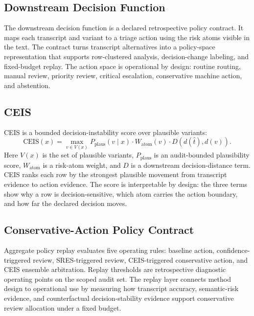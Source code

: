 \subsection{Downstream Decision Function}

The downstream decision function is a declared retrospective policy contract. It maps each transcript and variant to a triage action using the risk atoms visible in the text. The contract turns transcript alternatives into a policy-space representation that supports row-clustered analysis, decision-change labeling, and fixed-budget replay. The action space is operational by design: routine routing, manual review, priority review, critical escalation, conservative machine action, and abstention.

\subsection{CEIS}

CEIS is a bounded decision-instability score over plausible variants:
\[
\mathrm{CEIS}(x) = \max_{v \in V(x)} P_{\mathrm{plaus}}(v \mid x) \cdot W_{\mathrm{atom}}(v) \cdot D(d(\hat{t}), d(v)).
\]
Here $V(x)$ is the set of plausible variants, $P_{\mathrm{plaus}}$ is an audit-bounded plausibility score, $W_{\mathrm{atom}}$ is a risk-atom weight, and $D$ is a downstream decision-distance term. CEIS ranks each row by the strongest plausible movement from transcript evidence to action evidence. The score is interpretable by design: the three terms show why a row is decision-sensitive, which atom carries the action boundary, and how far the declared decision moves.

\subsection{Conservative-Action Policy Contract}

Aggregate policy replay evaluates five operating rules: baseline action, confidence-triggered review, SRES-triggered review, CEIS-triggered conservative action, and CEIS ensemble arbitration. Replay thresholds are retrospective diagnostic operating points on the scoped audit set. The replay layer connects method design to operational use by measuring how transcript accuracy, semantic-risk evidence, and counterfactual decision-stability evidence support conservative review allocation under a fixed budget.
